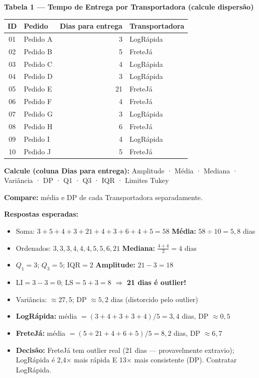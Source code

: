 \begin{BoardBox}
\textbf{Tabela 1 — Tempo de Entrega por Transportadora (calcule dispersão)}

\medskip
\begin{tabular}{|c|l|r|l|}
\hline
\textbf{ID} & \textbf{Pedido} & \textbf{Dias para entrega} & \textbf{Transportadora} \\
\hline
01 & Pedido A & 3  & LogRápida \\
02 & Pedido B & 5  & FreteJá  \\
03 & Pedido C & 4  & LogRápida \\
04 & Pedido D & 3  & LogRápida \\
05 & Pedido E & 21 & FreteJá  \\
06 & Pedido F & 4  & FreteJá  \\
07 & Pedido G & 3  & LogRápida \\
08 & Pedido H & 6  & FreteJá  \\
09 & Pedido I & 4  & LogRápida \\
10 & Pedido J & 5  & FreteJá  \\
\hline
\end{tabular}

\smallskip
\textbf{Calcule (coluna Dias para entrega):} Amplitude · Média · Mediana · Variância · DP · Q1 · Q3 · IQR · Limites Tukey

\textbf{Compare:} média e DP de cada Transportadora separadamente.

\smallskip
\textbf{Respostas esperadas:}
\begin{itemize}
  \item Soma: $3+5+4+3+21+4+3+6+4+5 = 58$ \quad \textbf{Média:} $58 \div 10 = 5{,}8$ dias
  \item Ordenados: $3,3,3,4,4,4,5,5,6,21$ \quad \textbf{Mediana:} $\frac{4+4}{2} = 4$ dias
  \item $Q_1 = 3$; $Q_3 = 5$; $\text{IQR} = 2$ \quad \textbf{Amplitude:} $21-3=18$
  \item $\text{LI} = 3 - 3 = 0$; $\text{LS} = 5 + 3 = 8$ $\Rightarrow$ \textbf{21 dias é outlier!}
  \item Variância: $\approx 27{,}5$; DP $\approx 5{,}2$ dias (distorcido pelo outlier)
  \item \textbf{LogRápida:} média $= (3+4+3+3+4)/5 = 3{,}4$ dias, DP $\approx 0{,}5$
  \item \textbf{FreteJá:} média $= (5+21+4+6+5)/5 = 8{,}2$ dias, DP $\approx 6{,}7$
  \item \textbf{Decisão:} FreteJá tem outlier real (21 dias — provavelmente extravio);
  LogRápida é 2,4× mais rápida E 13× mais consistente (DP). Contratar LogRápida.
\end{itemize}
\end{BoardBox}

